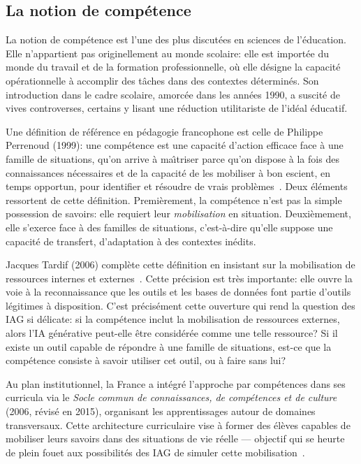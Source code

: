 \subsection{La notion de comp\'etence}

La notion de comp\'etence est l'une des plus discut\'ees en sciences de l'\'education. 
Elle n'appartient pas originellement au monde scolaire: elle est importée du monde du travail et de la formation professionnelle, o\`u elle d\'esigne la capacit\'e op\'erationnelle \`a accomplir des t\^aches dans des contextes d\'etermin\'es. 
Son introduction dans le cadre scolaire, amorc\'ee dans les ann\'ees 1990, a suscit\'e de vives controverses, certains y lisant une r\'eduction utilitariste de l'id\'eal \'educatif.

Une d\'efinition de r\'ef\'erence en p\'edagogie francophone est celle de Philippe Perrenoud (1999): une comp\'etence est \og{}une capacit\'e d'action efficace face \`a une famille de situations, qu'on arrive \`a ma\^\i triser parce qu'on dispose \`a la fois des connaissances n\'ecessaires et de la capacit\'e de les mobiliser \`a bon escient, en temps opportun, pour identifier et r\'esoudre de vrais probl\`emes\fg{}~\cite{perrenoud1999}. 
Deux \'el\'ements ressortent de cette d\'efinition. 
Premi\`erement, la comp\'etence n'est pas la simple possession de savoirs: elle requiert leur \emph{mobilisation} en situation.
Deuxi\`emement, elle s'exerce face \`a des \og{}familles de situations\fg{}, c'est-\`a-dire qu'elle suppose une capacit\'e de transfert, d'adaptation \`a des contextes in\'edits.

Jacques Tardif (2006) compl\`ete cette d\'efinition en insistant sur la mobilisation de \og{}ressources internes et externes\fg{}~\cite{tardif2006}. 
Cette pr\'ecision est très importante: elle ouvre la voie \`a la reconnaissance que les outils et les bases de donn\'ees font partie d'outils légitimes à disposition. 
C'est pr\'ecis\'ement cette ouverture qui rend la question des IAG si d\'elicate: si la comp\'etence inclut la mobilisation de ressources externes, alors l'IA g\'en\'erative peut-elle \^etre consid\'er\'ee comme une telle ressource? Si il existe un outil capable de répondre à une famille de situations, est-ce que la comp\'etence consiste à savoir utiliser cet outil, ou à faire sans lui?

Au plan institutionnel, la France a int\'egr\'e l'approche par comp\'etences dans ses curricula via le \emph{Socle commun de connaissances, de comp\'etences et de culture} (2006, r\'evis\'e en 2015), organisant les apprentissages autour de domaines transversaux. 
Cette architecture curriculaire vise \`a former des \'el\`eves capables de mobiliser leurs savoirs dans des situations de vie r\'eelle --- objectif qui se heurte de plein fouet aux possibilit\'es des IAG de simuler cette mobilisation~\cite{leroux2022}.

